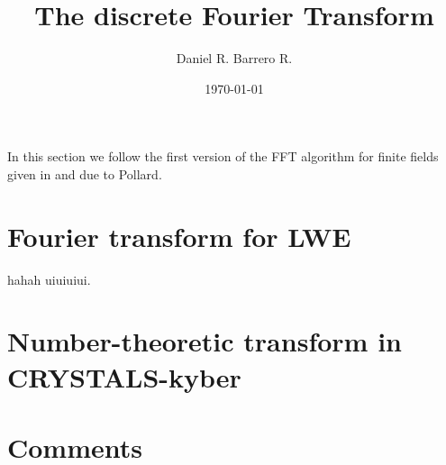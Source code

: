 \documentclass{amsart}
\title{The discrete Fourier Transform}
\author{Daniel R. Barrero R.}
\date{\today}
\begin{document}
\maketitle

\section{}

In this section we follow the first version of the FFT algorithm for finite
fields given in \cite{pollard-fftFiniteFields-1971} and due to Pollard.



\section{Fourier transform for LWE}

hahah \cite{regev-LWE-2009} uiuiuiui.

\section{Number-theoretic transform in CRYSTALS-kyber}

\section{Comments}



\end{document}
